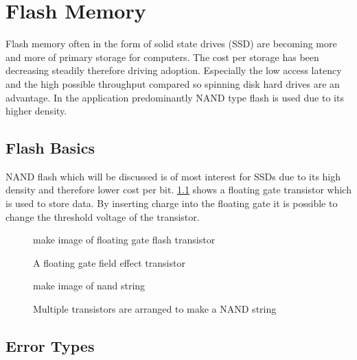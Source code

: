
\chapter{Flash Memory}
Flash memory often in the form of solid state drives (SSD) are becoming more and more of primary storage for computers. The cost per storage has been decreasing steadily therefore driving adoption. Especially the low access latency and the high possible throughput compared so spinning disk hard drives are an advantage. In the application predominantly NAND type flash is used due to its higher density. 


\section{Flash Basics}
NAND flash which will be discussed is of most interest for SSDs due to its high density and therefore lower cost per bit. \cref{fg_tans} shows a floating gate transistor which is used to store data. By inserting charge into the floating gate it is possible to change the threshold voltage of the transistor. 

\begin{figure}
    {make image of floating gate flash transistor}
    \centering
    \caption{A floating gate field effect transistor}
    \label{fg_tans}
\end{figure}

\begin{figure}
    {make image of nand string}
    \centering
    \caption{Multiple transistors are arranged to make a NAND string}
\end{figure}

\section{Error Types}

\cite{ZaTu16}